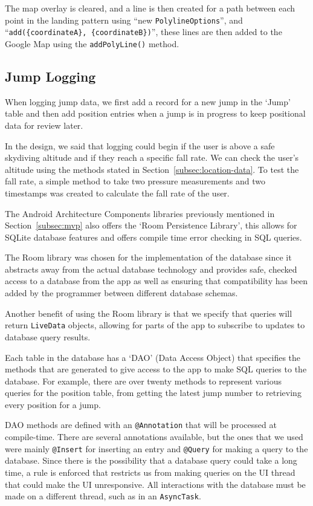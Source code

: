 The map overlay is cleared, and a line is then created for a path between each point in the landing pattern using ``new \texttt{PolylineOptions}'', and ``\verb|add({coordinateA}, {coordinateB})|'', these lines are then added to the Google Map using the \texttt{addPolyLine()} method.

\subsection{Jump Logging}
When logging jump data, we first add a record for a new jump in the `Jump' table and then add position entries when a jump is in progress to keep positional data for review later.

In the design, we said that logging could begin if the user is above a safe skydiving altitude and if they reach a specific fall rate. We can check the user's altitude using the methods stated in Section~\ref{subsec:location-data}. To test the fall rate, a simple method to take two pressure measurements and two timestamps was created to calculate the fall rate of the user.

The Android Architecture Components libraries previously mentioned in Section~\ref{subsec:mvp} also offers the `Room Persistence Library', this allows for SQLite database features and offers compile time error checking in SQL queries.

The Room library was chosen for the implementation of the database since it abstracts away from the actual database technology and provides safe, checked access to a database from the app as well as ensuring that compatibility has been added by the programmer between different database schemas.

Another benefit of using the Room library is that we specify that queries will return \texttt{LiveData} objects, allowing for parts of the app to subscribe to updates to database query results.

Each table in the database has a `DAO' (Data Access Object) that specifies the methods that are generated to give access to the app to make SQL queries to the database. For example, there are over twenty methods to represent various queries for the position table, from getting the latest jump number to retrieving every position for a jump.

DAO methods are defined with an \texttt{@Annotation} that will be processed at compile-time. There are several annotations available, but the ones that we used were mainly \texttt{@Insert} for inserting an entry and \texttt{@Query} for making a query to the database. Since there is the possibility that a database query could take a long time, a rule is enforced that restricts us from making queries on the UI thread that could make the UI unresponsive. All interactions with the database must be made on a different thread, such as in an \texttt{AsyncTask}.


